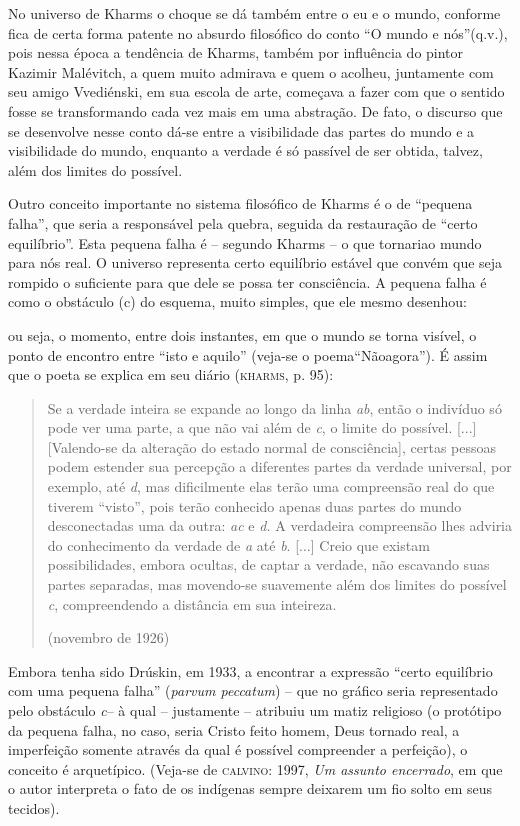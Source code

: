 No universo de Kharms o choque se dá também entre o eu e o mundo,
conforme fica de certa forma patente no absurdo filosófico do conto ``O
mundo e nós''(q.v.), pois nessa época a tendência de Kharms, também por
influência do pintor Kazimir Malévitch, a quem muito admirava e quem o
acolheu, juntamente com seu amigo Vvediénski, em sua escola de arte,
começava a fazer com que o sentido fosse se transformando cada vez mais
em uma abstração. De fato, o discurso que se desenvolve nesse conto
dá-se entre a visibilidade das partes do mundo e a visibilidade do
mundo, enquanto a verdade é só passível de ser obtida, talvez, além dos
limites do possível.

Outro conceito importante no sistema filosófico de Kharms é o de
``pequena falha'', que seria a responsável pela quebra, seguida da
restauração de ``certo equilíbrio''. Esta pequena falha é -- segundo
Kharms -- o que tornariao mundo para nós real. O universo representa
certo equilíbrio estável que convém que seja rompido o suficiente para
que dele se possa ter consciência. A pequena falha é como o obstáculo
(c) do esquema, muito simples, que ele mesmo desenhou:

ou seja, o momento, entre dois instantes, em que o mundo se torna
visível, o ponto de encontro entre ``isto e aquilo'' (veja-se o
poema``Nãoagora''). É assim que o poeta se explica em seu diário
(\textsc{kharms}, p. 95):

\begin{quote}
Se a verdade inteira se expande ao longo da linha \emph{ab}, então o
indivíduo só pode ver uma parte, a que não vai além de \emph{c}, o
limite do possível. {[}...{]} {[}Valendo-se da alteração do estado
normal de consciência{]}, certas pessoas podem estender sua percepção a
diferentes partes da verdade universal, por exemplo, até \emph{d}, mas
dificilmente elas terão uma compreensão real do que tiverem ``visto'',
pois terão conhecido apenas duas partes do mundo desconectadas uma da
outra: \emph{ac} e \emph{d.} A verdadeira compreensão lhes adviria do
conhecimento da verdade de \emph{a} até \emph{b}. {[}...{]} Creio que
existam possibilidades, embora ocultas, de captar a verdade, não
escavando suas partes separadas, mas movendo-se suavemente além dos
limites do possível \emph{c}, compreendendo a distância em sua
inteireza.

(novembro de 1926)
\end{quote}

Embora tenha sido Drúskin, em 1933, a encontrar a expressão ``certo
equilíbrio com uma pequena falha'' (\emph{parvum peccatum}) -- que no
gráfico seria representado pelo obstáculo \emph{c}-- à qual --
justamente -- atribuiu um matiz religioso (o protótipo da pequena falha,
no caso, seria Cristo feito homem, Deus tornado real, a imperfeição
somente através da qual é possível compreender a perfeição), o conceito
é arquetípico. (Veja-se de \textsc{calvino}: 1997, \emph{Um assunto
encerrado}, em que o autor interpreta o fato de os indígenas sempre
deixarem um fio solto em seus tecidos).

